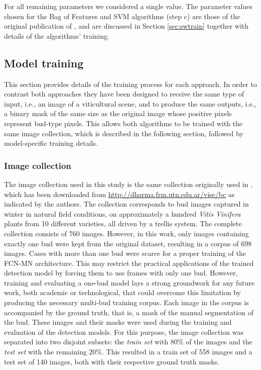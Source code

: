 \documentclass[a4paper,authoryear,review]{elsarticle}
\begin{document}
	For all remaining parameters we considered a single value. The parameter values chosen for the Bag of Features and SVM algorithms (step c) are those of the original publication of \citet{perez2017image}, and are discussed in Section \ref{sec:swtrain} together with details of the algorithms’ training.
	
	
	\subsection{Model training}
	\label{sec:train}
	
	This section provides details of the training process for each approach. In order to contrast both approaches they have been designed to receive the same type of input, i.e., an image of a viticultural scene, and to produce the same outputs, i.e., a binary mask of the same size as the original image whose positive pixels represent bud-type pixels. This allows both algorithms to be trained with the same image collection, which is described in the following section, followed by model-specific training details.
	
	\subsubsection{Image collection}
	\label{sec:collection}
	
	The image collection used in this study is the same collection originally used in \citet{perez2017image}, which has been downloaded from \url{
		http://dharma.frm.utn.edu.ar/vise/bc} as indicated by the authors. 
	The collection corresponds to bud images captured in winter in natural field conditions, on approximately a hundred \emph{Vitis Vinifera} plants from 10 different varieties, all driven by a trellis system. The complete collection consists of 760 images. 
	However, in this work, only images containing exactly one bud were kept from the original dataset, resulting in a corpus of 698 images. Cases with more than one bud were scarce for a proper training of the FCN-MN architecture. This may restrict the practical applications of the trained detection model by forcing them to use frames with only one bud. However, training and evaluating a one-bud model lays a strong groundwork for any future work, both academic or technological, that could overcome this limitation by producing the necessary multi-bud training corpus. 
	Each image in the corpus is accompanied by the ground truth, that is, a mask of the manual segmentation of the bud. These images and their masks were used during the training and evaluation of the detection models. For this purpose, the image collection was separated into two disjoint subsets: the \emph{train set} with $80\%$ of the images and the \emph{test set} with the remaining $20\%$. This resulted in a train set of 558 images and a test set of 140 images, both with their respective ground truth masks.
\end{document}
